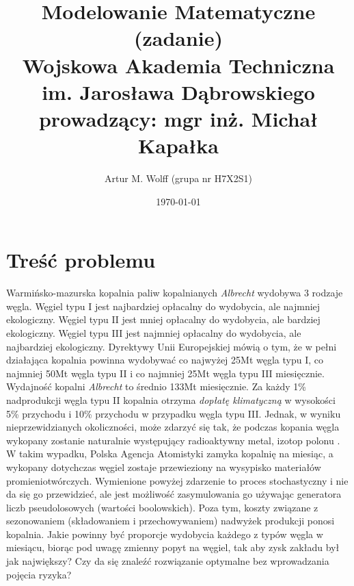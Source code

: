 \documentclass[titlepage]{article}
\title{
	\Large{Modelowanie Matematyczne (zadanie)}
	\\
	\normalsize{Wojskowa Akademia Techniczna im. Jarosława Dąbrowskiego}
	\\
	\normalsize{prowadzący: mgr inż. Michał Kapałka}
	}
\author{Artur M. Wolff (grupa nr H7X2S1)}
\date{\today}
\begin{document}
\maketitle

\section{Treść problemu}
Warmińsko-mazurska kopalnia paliw kopalnianych \textit{Albrecht} wydobywa 3 rodzaje węgla.
Węgiel typu I jest najbardziej opłacalny do wydobycia, ale najmniej ekologiczny.
Węgiel typu II jest mniej opłacalny do wydobycia, ale bardziej ekologiczny.
Węgiel typu III jest najmniej opłacalny do wydobycia, ale najbardziej ekologiczny.
Dyrektywy Unii Europejskiej mówią o tym, że w pełni działająca kopalnia powinna wydobywać co najwyżej 25Mt węgla typu I, co najmniej 50Mt węgla typu II i co najmniej 25Mt węgla typu III miesięcznie.
Wydajność kopalni \textit{Albrecht} to średnio 133Mt miesięcznie.
Za każdy 1\% nadprodukcji węgla typu II kopalnia otrzyma \textit{dopłatę klimatyczną} w wysokości 5\% przychodu i 10\% przychodu w przypadku węgla typu III.
Jednak, w wyniku nieprzewidzianych okoliczności, może zdarzyć się tak, że podczas kopania węgla wykopany zostanie naturalnie występujący radioaktywny metal, izotop polonu .
W takim wypadku, Polska Agencja Atomistyki zamyka kopalnię na miesiąc, a wykopany dotychczas węgiel zostaje przewieziony na wysypisko materiałów promieniotwórczych.
Wymienione powyżej zdarzenie to proces stochastyczny i nie da się go przewidzieć, ale jest możliwość zasymulowania go używając generatora liczb pseudolosowych (wartości boolowskich).
Poza tym, koszty związane z sezonowaniem (składowaniem i przechowywaniem) nadwyżek produkcji ponosi kopalnia.
Jakie powinny być proporcje wydobycia każdego z typów węgla w miesiącu, biorąc pod uwagę zmienny popyt na węgiel, tak aby zysk zakładu był jak największy?
Czy da się znaleźć rozwiązanie optymalne bez wprowadzania pojęcia ryzyka?
\end{document}
